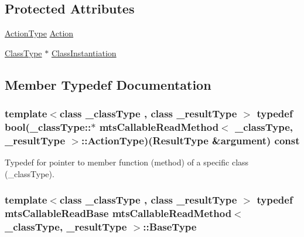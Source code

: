 \subsection*{Protected Attributes}
\begin{DoxyCompactItemize}
\item 
\hyperlink{classmts_callable_read_method_a859894f8cceaba38ff140b96f4b8ae11}{Action\-Type} \hyperlink{classmts_callable_read_method_af163759634008d6c6c16a079d78b525d}{Action}
\item 
\hyperlink{classmts_callable_read_method_a44650138085a29d60a4f3cb3616abbbf}{Class\-Type} $\ast$ \hyperlink{classmts_callable_read_method_ae3a9299dd267fc9c88d97769a09a6397}{Class\-Instantiation}
\end{DoxyCompactItemize}


\subsection{Member Typedef Documentation}
\hypertarget{classmts_callable_read_method_a859894f8cceaba38ff140b96f4b8ae11}{
\subsubsection[{Action\-Type}]{\setlength{\rightskip}{0pt plus 5cm}template$<$class \-\_\-class\-Type , class \-\_\-result\-Type $>$ typedef bool(\-\_\-class\-Type\-::$\ast$ {\bf mts\-Callable\-Read\-Method}$<$ \-\_\-class\-Type, \-\_\-result\-Type $>$\-::Action\-Type)({\bf Result\-Type} \&argument) const }}\label{classmts_callable_read_method_a859894f8cceaba38ff140b96f4b8ae11}
Typedef for pointer to member function (method) of a specific class (\-\_\-class\-Type). \hypertarget{classmts_callable_read_method_a83876b0239f91889b077ab015b11f297}{
\subsubsection[{Base\-Type}]{\setlength{\rightskip}{0pt plus 5cm}template$<$class \-\_\-class\-Type , class \-\_\-result\-Type $>$ typedef {\bf mts\-Callable\-Read\-Base} {\bf mts\-Callable\-Read\-Method}$<$ \-\_\-class\-Type, \-\_\-result\-Type $>$\-::{\bf Base\-Type}}}\label{classmts_callable_read_method_a83876b0239f91889b077ab015b11f297}

